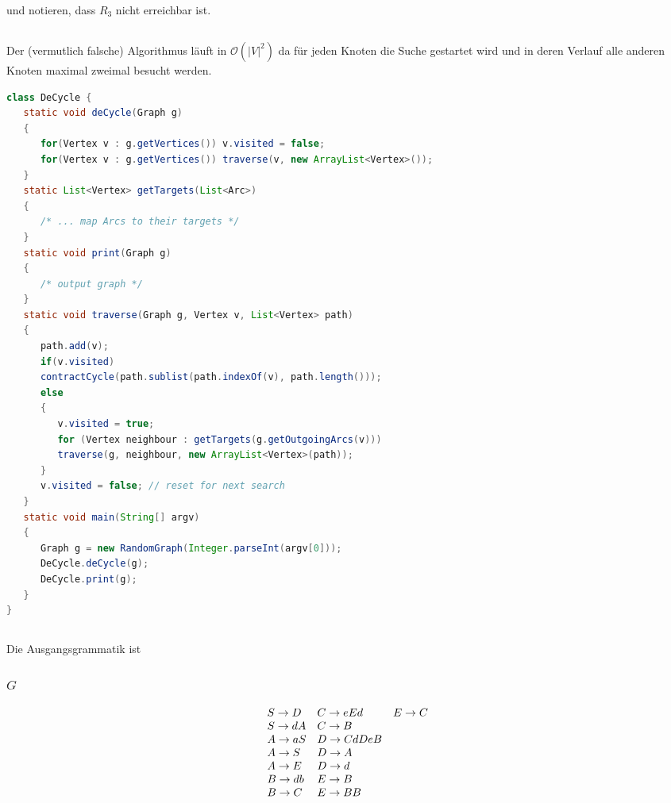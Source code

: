 \documentclass{article}
\begin{document}
und notieren, dass $R_3$ nicht erreichbar ist.

\subsection{} 


Der (vermutlich falsche) Algorithmus l\"auft in $\mathcal{O}\left(|V|^2\right)$
da f\"ur jeden Knoten die Suche gestartet wird und in deren Verlauf alle anderen
Knoten maximal zweimal besucht werden.
\begin{lstlisting}[language=Java]
class DeCycle {
   static void deCycle(Graph g)
   {
      for(Vertex v : g.getVertices()) v.visited = false;
      for(Vertex v : g.getVertices()) traverse(v, new ArrayList<Vertex>());
   }
   static List<Vertex> getTargets(List<Arc>)
   {
      /* ... map Arcs to their targets */
   }
   static void print(Graph g)
   {
      /* output graph */
   }
   static void traverse(Graph g, Vertex v, List<Vertex> path)
   {
      path.add(v);
      if(v.visited) 
      contractCycle(path.sublist(path.indexOf(v), path.length()));
      else
      {
         v.visited = true;
         for (Vertex neighbour : getTargets(g.getOutgoingArcs(v)))
         traverse(g, neighbour, new ArrayList<Vertex>(path));
      }
      v.visited = false; // reset for next search
   }
   static void main(String[] argv)
   {
      Graph g = new RandomGraph(Integer.parseInt(argv[0]));
      DeCycle.deCycle(g);
      DeCycle.print(g);
   }
}
\end{lstlisting}

\subsection{} 

Die Ausgangsgrammatik ist

\subsubsection{$G$}
\begin{align*}
\begin{array}{lll}
   S \rightarrow D & C \rightarrow eEd & E \rightarrow C \\
   S \rightarrow dA & C \rightarrow B \\
   A \rightarrow aS & D \rightarrow CdDeB \\
   A \rightarrow S & D \rightarrow A \\
   A \rightarrow E & D \rightarrow d \\
   B \rightarrow db & E \rightarrow B \\
   B \rightarrow C & E \rightarrow BB
\end{array}
\end{align*}
\end{document}
